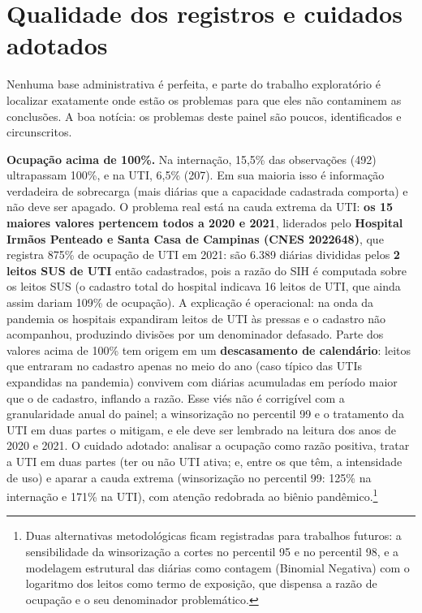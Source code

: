\section{Qualidade dos registros e cuidados adotados}
\label{sec:qualidade}

Nenhuma base administrativa é perfeita, e parte do trabalho
exploratório é localizar exatamente onde estão os problemas para que
eles não contaminem as conclusões. A boa notícia: os problemas deste
painel são poucos, identificados e circunscritos.

\textbf{Ocupação acima de 100\%.} Na internação, 15,5\% das observações
(492) ultrapassam 100\%, e na UTI, 6,5\% (207). Em sua maioria isso é
informação verdadeira de sobrecarga (mais diárias que a capacidade
cadastrada comporta) e não deve ser apagado. O problema real está na
cauda extrema da UTI: \textbf{os 15 maiores valores pertencem todos a
2020 e 2021}, liderados pelo \textbf{Hospital Irmãos Penteado e Santa
Casa de Campinas (CNES 2022648)}, que registra 875\% de ocupação de UTI
em 2021: são 6.389 diárias divididas pelos \textbf{2 leitos SUS de UTI}
então cadastrados, pois a razão do SIH é computada sobre os leitos SUS
(o cadastro total do hospital indicava 16 leitos de UTI, que ainda
assim dariam 109\% de ocupação). A
explicação é operacional: na onda da pandemia os hospitais expandiram
leitos de UTI às pressas e o cadastro não acompanhou, produzindo
divisões por um denominador defasado. Parte dos valores acima de 100\%
tem origem em um \textbf{descasamento de calendário}: leitos que
entraram no cadastro apenas no meio do ano (caso típico das UTIs
expandidas na pandemia) convivem com diárias acumuladas em período
maior que o de cadastro, inflando a razão. Esse viés não é corrigível
com a granularidade anual do painel; a winsorização no percentil 99 e o
tratamento da UTI em duas partes o mitigam, e ele deve ser lembrado na
leitura dos anos de 2020 e 2021. O cuidado adotado: analisar a
ocupação como razão positiva, tratar a UTI em duas partes (ter ou não
UTI ativa; e, entre os que têm, a intensidade de uso) e aparar a cauda
extrema (winsorização no percentil 99: 125\% na internação e 171\% na
UTI), com atenção redobrada ao biênio pandêmico.\footnote{Duas
alternativas metodológicas ficam registradas para trabalhos futuros: a
sensibilidade da winsorização a cortes no percentil 95 e no percentil
98, e a modelagem estrutural das diárias como contagem (Binomial
Negativa) com o logaritmo dos leitos como termo de exposição, que
dispensa a razão de ocupação e o seu denominador problemático.}

